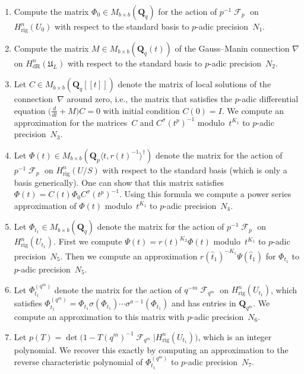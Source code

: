 \documentclass[a4paper,11pt]{article}
\makeatletter
\numberwithin{equation}{section}
\DeclareMathOperator{\Frob}{\mathcal{F}} %
\providecommand{\HdR}{H_{\text{dR}}}    %
\providecommand{\Hrig}{H_{\text{rig}}}  %
\theoremstyle{definition}
\newcommand{\Rmnum}[1]{\expandafter\@slowromancap\romannumeral #1@}
\makeatother
\begin{document}
\begin{enumerate}
\item[Step~$\Rmnum{1}$.]
Compute the matrix $\Phi_0 \in M_{b \times b}(\mathbf{Q}_q)$ for the action 
of $p^{-1} \Frob_p$ on $\Hrig^{n}(U_0)$ with respect to the standard basis 
to $p$-adic precision~$N_1$.  
\item[Step~$\Rmnum{2}$.]
Compute the matrix $M \in M_{b \times b}(\mathbf{Q}_q(t))$ of the 
Gauss--Manin connection $\nabla$ on $\HdR^{n}(\mathfrak{U}_L)$ with 
respect to the standard basis to $p$-adic precision~$N_2$.
\item[Step~$\Rmnum{3}$.]
Let $C \in M_{b \times b} (\mathbf{Q}_q[[t]])$ denote the matrix of 
local solutions of the connection~$\nabla$ around zero, i.e., 
the matrix that satisfies the $p$-adic differential equation 
$\bigl(\tfrac{d}{dt} + M\bigr) C = 0$ with initial condition $C(0)=I$.  
We compute an approximation for the matrices~$C$ and 
$C^{\sigma}(t^p)^{-1}$ modulo~$t^{K_1}$ to $p$-adic precision~$N_3$.
\item[Step~$\Rmnum{4}$.]
Let $\Phi(t) \in M_{b \times b}(\mathbf{Q}_p\langle t,r(t)^{-1}\rangle^{\dagger})$ 
denote the matrix for the action of $p^{-1} \Frob_p$ on $\Hrig^{n}(U/S)$ with 
respect to the standard basis (which is only a basis generically).  One can 
show that this matrix satisfies $\Phi(t) = C(t) \Phi_0 C^{\sigma}(t^p)^{-1}$.
Using this formula we compute a power series approximation of $\Phi(t)$ 
modulo~$t^{K_1}$ to $p$-adic precision~$N_4$.
\item[Step~$\Rmnum{5}$.]
Let $\Phi_{t_1} \in M_{b \times b}(\mathbf{Q}_q)$ denote the matrix for 
the action of $p^{-1} \Frob_p$ on $\Hrig^{n}(U_{t_1})$. First we compute 
$\Psi(t) = r(t)^{K_2} \Phi(t)$ modulo~$t^{K_1}$ to $p$-adic precision~$N_5$. 
Then we compute an approximation $r(\hat{t}_1)^{-K_1} \Psi(\hat{t}_1)$ for 
$\Phi_{t_1}$ to $p$-adic precision~$N_5$.
\item[Step~$\Rmnum{6}$.]
Let $\Phi_{t_1}^{(q^m)}$ denote the matrix for the action of 
$q^{-m} \Frob_{q^m}$ on $\Hrig^{n}(U_{t_1})$, which satisfies 
$\Phi_{t_1}^{(q^m)} = \Phi_{t_1} \sigma(\Phi_{t_1}) \dotsm \sigma^{a-1}(\Phi_{t_1})$ 
and has entries in $\mathbf{Q}_{q^m}$.  We compute an approximation to 
this matrix with $p$-adic precision~$N_6$.
\item[Step~$\Rmnum{7}$.]
Let $p(T) = \det\bigl(1 - T (q^m)^{-1} \Frob_{q^m} | \Hrig^n(U_{t_1})\bigr)$, 
which is an integer polynomial.  We recover this exactly by computing an 
approximation to the reverse characteristic polynomial of $\Phi_{t_1}^{(q^m)}$
to $p$-adic precision~$N_7$.
\end{enumerate}
\end{document}
